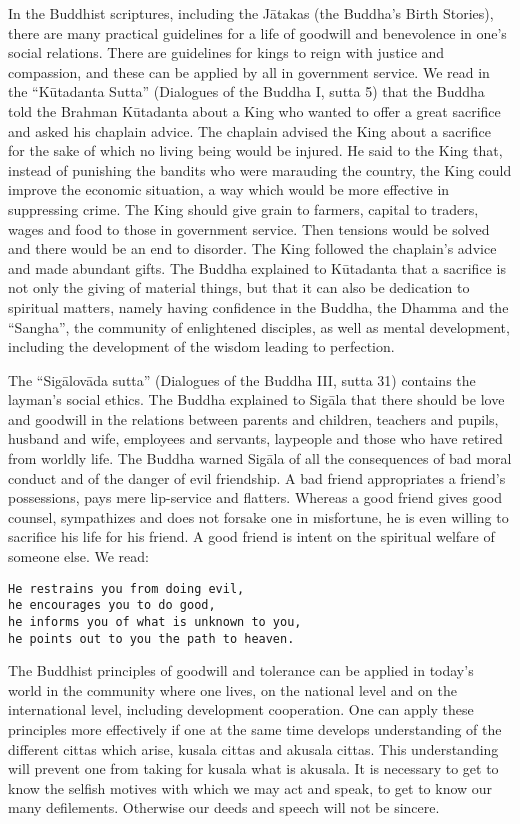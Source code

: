 \documentclass{book}
\begin{document}
In the Buddhist scriptures, including the Jātakas (the Buddha's Birth
Stories), there are many practical guidelines for a life of goodwill and
benevolence in one's social relations. There are guidelines for kings to
reign with justice and compassion, and these can be applied by all in
government service. We read in the ``Kūtadanta Sutta'' (Dialogues of the
Buddha I, sutta 5) that the Buddha told the Brahman Kūtadanta about a
King who wanted to offer a great sacrifice and asked his chaplain
advice. The chaplain advised the King about a sacrifice for the sake of
which no living being would be injured. He said to the King that,
instead of punishing the bandits who were marauding the country, the
King could improve the economic situation, a way which would be more
effective in suppressing crime. The King should give grain to farmers,
capital to traders, wages and food to those in government service. Then
tensions would be solved and there would be an end to disorder. The King
followed the chaplain's advice and made abundant gifts. The Buddha
explained to Kūtadanta that a sacrifice is not only the giving of
material things, but that it can also be dedication to spiritual
matters, namely having confidence in the Buddha, the Dhamma and the
``Sangha'', the community of enlightened disciples, as well as mental
development, including the development of the wisdom leading to
perfection.

The ``Sigālovāda sutta'' (Dialogues of the Buddha III, sutta 31)
contains the layman's social ethics. The Buddha explained to Sigāla that
there should be love and goodwill in the relations between parents and
children, teachers and pupils, husband and wife, employees and servants,
laypeople and those who have retired from worldly life. The Buddha
warned Sigāla of all the consequences of bad moral conduct and of the
danger of evil friendship. A bad friend appropriates a friend's
possessions, pays mere lip-service and flatters. Whereas a good friend
gives good counsel, sympathizes and does not forsake one in misfortune,
he is even willing to sacrifice his life for his friend. A good friend
is intent on the spiritual welfare of someone else. We read:

\begin{verbatim}
He restrains you from doing evil,
he encourages you to do good,
he informs you of what is unknown to you,
he points out to you the path to heaven.
\end{verbatim}

The Buddhist principles of goodwill and tolerance can be applied in
today's world in the community where one lives, on the national level
and on the international level, including development cooperation. One
can apply these principles more effectively if one at the same time
develops understanding of the different cittas which arise, kusala
cittas and akusala cittas. This understanding will prevent one from
taking for kusala what is akusala. It is necessary to get to know the
selfish motives with which we may act and speak, to get to know our many
defilements. Otherwise our deeds and speech will not be sincere.
\end{document}
